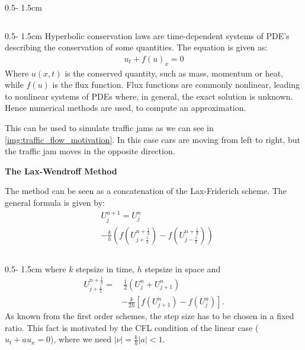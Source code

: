 \documentclass{uibposter}
\begin{document}
\begin{frame}[fragile]
\begin{columns}
\begin{column}{0.5\textwidth - 1.5cm}
\begin{column}{0.5\textwidth - 1.5cm}
Hyperbolic conservation laws are time-dependent systems of PDE's describing the conservation of some quantities. The equation is given as:
\begin{align*}
    u_t + f(u)_x = 0
\end{align*}
Where $u(x,t)$ is the conserved quantity, such as mass, momentum or heat, while $f(u)$ is the flux function. Flux functions are commonly nonlinear, leading to nonlinear systems of PDEs where, in general, the exact solution is unknown. Hence numerical methods are used, to compute an approximation. 

\vspace{0.5cm}
This can be used to simulate traffic jams as we can see in \cref{img:traffic_flow_motivation}. In this case cars are moving from left to right, but the traffic jam moves in the opposite direction. 

\vspace{0.5cm}
\textbf{The Lax-Wendroff Method}

\vspace{0.5cm}
The method can be seen as a concatenation of the Lax-Friderich scheme.
The general formula is given by:
\begin{align*}
&U_j^{n+1} = U_j^n\\
&- \frac{k}{h}\left(f\left(U_{j+\frac{1}{2}}^{n+\frac{1}{2}}\right) - f\left(U_{j-\frac{1}{2}}^{n+\frac{1}{2}}\right)\right)
\end{align*}

\end{column}
\begin{column}{0.5\textwidth - 1.5cm}
where $k$ stepsize in time, $h$ stepsize in space and
\begin{align*}
U_{j+\frac{1}{2}}^{n+\frac{1}{2}} =&~ \frac{1}{2} (U_j^n + U_{j+1}^n)\\
&- \frac{k}{2h}[f(U_{j+1}^n) - f(U_j^n)].
\end{align*}
As known from the first order schemes, the step size has to be chosen in a fixed ratio. This fact is motivated by the CFL condition of the linear case ($u_t + au_x = 0$), where we need $|\nu| = \frac{k}{h} |a| < 1$. 


\end{column}
\end{column}
\end{columns}
\end{frame}
\end{document}
